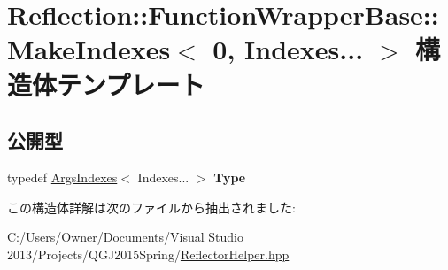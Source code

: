 \hypertarget{struct_reflection_1_1_function_wrapper_base_1_1_make_indexes_3_010_00_01_indexes_8_8_8_01_4}{}\section{Reflection\+:\+:Function\+Wrapper\+Base\+:\+:Make\+Indexes$<$ 0, Indexes... $>$ 構造体テンプレート}
\label{struct_reflection_1_1_function_wrapper_base_1_1_make_indexes_3_010_00_01_indexes_8_8_8_01_4}
\subsection*{公開型}
\begin{DoxyCompactItemize}
\item 
typedef \hyperlink{struct_reflection_1_1_function_wrapper_base_1_1_args_indexes}{Args\+Indexes}$<$ Indexes... $>$ {\bfseries Type}\hypertarget{struct_reflection_1_1_function_wrapper_base_1_1_make_indexes_3_010_00_01_indexes_8_8_8_01_4_ac7d811c386c8a4606539aa9bbd2afbed}{}\label{struct_reflection_1_1_function_wrapper_base_1_1_make_indexes_3_010_00_01_indexes_8_8_8_01_4_ac7d811c386c8a4606539aa9bbd2afbed}

\end{DoxyCompactItemize}


この構造体詳解は次のファイルから抽出されました\+:\begin{DoxyCompactItemize}
\item 
C\+:/\+Users/\+Owner/\+Documents/\+Visual Studio 2013/\+Projects/\+Q\+G\+J2015\+Spring/\hyperlink{_reflector_helper_8hpp}{Reflector\+Helper.\+hpp}\end{DoxyCompactItemize}
